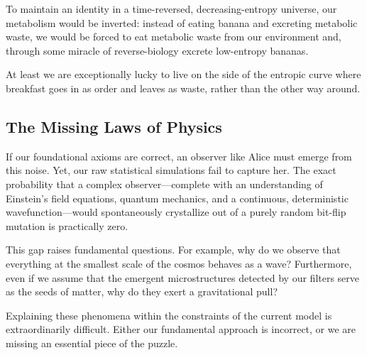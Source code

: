 To maintain an identity in a time-reversed, decreasing-entropy universe, our metabolism would be inverted: instead of eating banana and excreting metabolic waste, we would be forced to eat metabolic waste from our environment and, through some miracle of reverse-biology excrete low-entropy bananas.

At least we are exceptionally lucky to live on the side of the entropic curve where breakfast goes in as order and leaves as waste, rather than the other way around.

\subsection*{The Missing Laws of Physics}

If our foundational axioms are correct, an observer like Alice must emerge from this noise. Yet, our raw statistical simulations fail to capture her. The exact probability that a complex observer—complete with an understanding of Einstein's field equations, quantum mechanics, and a continuous, deterministic wavefunction—would spontaneously crystallize out of a purely random bit-flip mutation is practically zero.

This gap raises fundamental questions. For example, why do we observe that everything at the smallest scale of the cosmos behaves as a wave? Furthermore, even if we assume that the emergent microstructures detected by our filters serve as the seeds of matter, why do they exert a gravitational pull?

Explaining these phenomena within the constraints of the current model is extraordinarily difficult. Either our fundamental approach is incorrect, or we are missing an essential piece of the puzzle.
